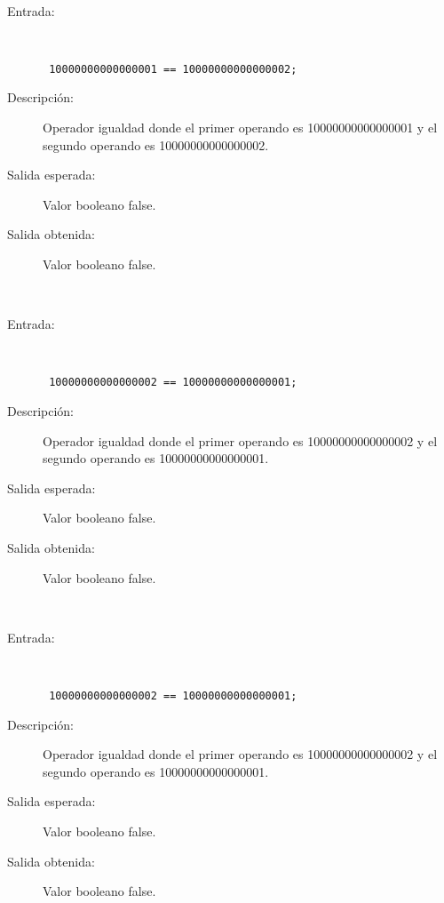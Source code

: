\hfil \\
	\begin{description}
		\item [Entrada:] \hfill \\
\begin{lstlisting}
 10000000000000001 == 10000000000000002;
\end{lstlisting}
		\item [Descripción:] Operador igualdad donde el primer operando es 10000000000000001 y el segundo operando es  10000000000000002.
		\item [Salida esperada:] Valor booleano false.
		\item [Salida obtenida:] Valor booleano false.
	\end{description}
\hfil \\
	\begin{description}
		\item [Entrada:] \hfill \\
\begin{lstlisting}
 10000000000000002 == 10000000000000001;
\end{lstlisting}
		\item [Descripción:] Operador igualdad donde el primer operando es 10000000000000002 y el segundo operando es  10000000000000001.
		\item [Salida esperada:] Valor booleano false.
		\item [Salida obtenida:] Valor booleano false.
	\end{description}
\hfil \\
	\begin{description}
		\item [Entrada:] \hfill \\
\begin{lstlisting}
 10000000000000002 == 10000000000000001;
\end{lstlisting}
		\item [Descripción:] Operador igualdad donde el primer operando es 10000000000000002 y el segundo operando es  10000000000000001.
		\item [Salida esperada:] Valor booleano false.
		\item [Salida obtenida:] Valor booleano false.
	\end{description}
